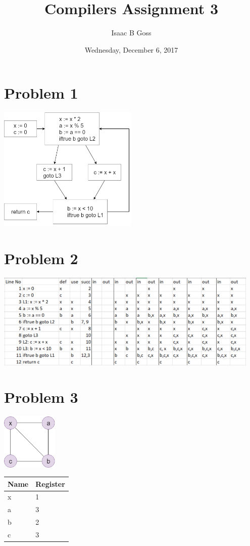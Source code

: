 \documentclass{article}
\author{Isaac B Goss}
\title{Compilers Assignment 3}
\date{Wednesday, December 6, 2017}
\providecommand{\prob}[1]{\section*{Problem #1}}
\begin{document}
\maketitle

\prob{1}
\begin{center}
    \includegraphics[width=0.5\textwidth]{ControlFlowGraph}
\end{center}

\prob{2}
\begin{center}
    \includegraphics[width=0.95\textwidth]{LivenessPic}
\end{center}


\prob{3}
\begin{center}
\includegraphics[width=0.2\textwidth]{InterferenceGraph}

    \begin{tabular}{l|l}
        \textbf{Name} & \textbf{Register}\\
        \hline
        x & 1 \\
        a & 3 \\
        b & 2 \\
        c & 3 \\
    \end{tabular}
    
\end{center}
\end{document}
